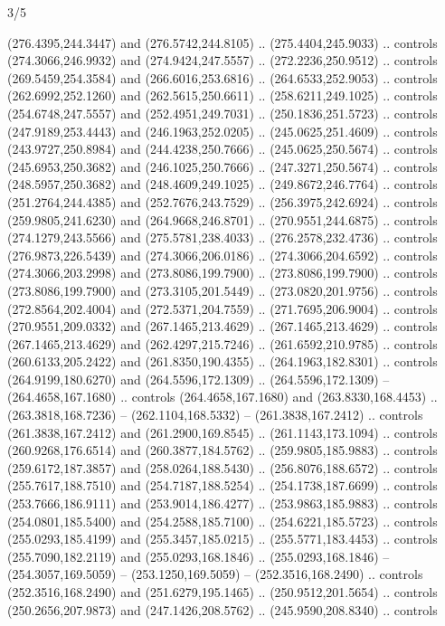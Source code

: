 \begin{flagdescription}{3/5}
\begin{scope}[xshift=0.5\flaglength,yshift=0.5\flagwidth,scale=\flagwidth/270]
\begin{scope}[y=0.8pt, x=0.8pt, yscale=-1,shift={(-281.25,-168.75)}]
  (276.4395,244.3447) and (276.5742,244.8105) .. (275.4404,245.9033) .. controls
  (274.3066,246.9932) and (274.9424,247.5557) .. (272.2236,250.9512) .. controls
  (269.5459,254.3584) and (266.6016,253.6816) .. (264.6533,252.9053) .. controls
  (262.6992,252.1260) and (262.5615,250.6611) .. (258.6211,249.1025) .. controls
  (254.6748,247.5557) and (252.4951,249.7031) .. (250.1836,251.5723) .. controls
  (247.9189,253.4443) and (246.1963,252.0205) .. (245.0625,251.4609) .. controls
  (243.9727,250.8984) and (244.4238,250.7666) .. (245.0625,250.5674) .. controls
  (245.6953,250.3682) and (246.1025,250.7666) .. (247.3271,250.5674) .. controls
  (248.5957,250.3682) and (248.4609,249.1025) .. (249.8672,246.7764) .. controls
  (251.2764,244.4385) and (252.7676,243.7529) .. (256.3975,242.6924) .. controls
  (259.9805,241.6230) and (264.9668,246.8701) .. (270.9551,244.6875) .. controls
  (274.1279,243.5566) and (275.5781,238.4033) .. (276.2578,232.4736) .. controls
  (276.9873,226.5439) and (274.3066,206.0186) .. (274.3066,204.6592) .. controls
  (274.3066,203.2998) and (273.8086,199.7900) .. (273.8086,199.7900) .. controls
  (273.8086,199.7900) and (273.3105,201.5449) .. (273.0820,201.9756) .. controls
  (272.8564,202.4004) and (272.5371,204.7559) .. (271.7695,206.9004) .. controls
  (270.9551,209.0332) and (267.1465,213.4629) .. (267.1465,213.4629) .. controls
  (267.1465,213.4629) and (262.4297,215.7246) .. (261.6592,210.9785) .. controls
  (260.6133,205.2422) and (261.8350,190.4355) .. (264.1963,182.8301) .. controls
  (264.9199,180.6270) and (264.5596,172.1309) .. (264.5596,172.1309) --
  (264.4658,167.1680) .. controls (264.4658,167.1680) and (263.8330,168.4453) ..
  (263.3818,168.7236) -- (262.1104,168.5332) -- (261.3838,167.2412) .. controls
  (261.3838,167.2412) and (261.2900,169.8545) .. (261.1143,173.1094) .. controls
  (260.9268,176.6514) and (260.3877,184.5762) .. (259.9805,185.9883) .. controls
  (259.6172,187.3857) and (258.0264,188.5430) .. (256.8076,188.6572) .. controls
  (255.7617,188.7510) and (254.7187,188.5254) .. (254.1738,187.6699) .. controls
  (253.7666,186.9111) and (253.9014,186.4277) .. (253.9863,185.9883) .. controls
  (254.0801,185.5400) and (254.2588,185.7100) .. (254.6221,185.5723) .. controls
  (255.0293,185.4199) and (255.3457,185.0215) .. (255.5771,183.4453) .. controls
  (255.7090,182.2119) and (255.0293,168.1846) .. (255.0293,168.1846) --
  (254.3057,169.5059) -- (253.1250,169.5059) -- (252.3516,168.2490) .. controls
  (252.3516,168.2490) and (251.6279,195.1465) .. (250.9512,201.5654) .. controls
  (250.2656,207.9873) and (247.1426,208.5762) .. (245.9590,208.8340) .. controls

\end{scope}
\end{scope}
\end{flagdescription}
